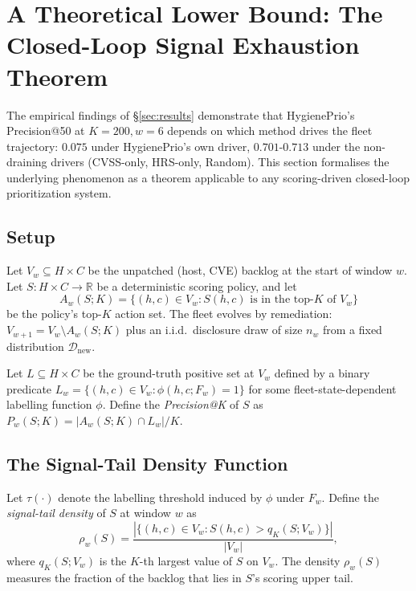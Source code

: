 \section{A Theoretical Lower Bound: The Closed-Loop Signal Exhaustion Theorem}
\label{sec:theorem}

The empirical findings of \S\ref{sec:results} demonstrate that
HygienePrio's Precision@50 at $K = 200, w = 6$ depends on which method
drives the fleet trajectory: $0.075$ under HygienePrio's own driver,
$0.701$-$0.713$ under the non-draining drivers (CVSS-only, HRS-only,
Random). This section formalises the
underlying phenomenon as a theorem applicable to any
scoring-driven closed-loop prioritization system.

\subsection{Setup}

Let $V_w \subseteq H \times C$ be the unpatched (host, CVE) backlog
at the start of window $w$. Let $S: H \times C \to \mathbb{R}$ be a
deterministic scoring policy, and let
\begin{equation}
A_w(S; K) = \{(h, c) \in V_w : S(h, c) \text{ is in the top-}K \text{ of } V_w\}
\end{equation}
be the policy's top-$K$ action set. The fleet evolves by remediation:
$V_{w+1} = V_w \setminus A_w(S; K)$ plus an i.i.d.\ disclosure draw
of size $n_w$ from a fixed distribution $\mathcal{D}_{\text{new}}$.

Let $L \subseteq H \times C$ be the ground-truth positive set
at $V_w$ defined by a binary predicate
$L_w = \{(h, c) \in V_w : \phi(h, c; F_w) = 1\}$ for some
fleet-state-dependent labelling function $\phi$. Define the
\emph{Precision@K} of $S$ as $P_w(S; K) = |A_w(S; K) \cap L_w| / K$.

\subsection{The Signal-Tail Density Function}

Let $\tau(\cdot)$ denote the labelling threshold induced by $\phi$
under $F_w$. Define the \emph{signal-tail density} of $S$ at window
$w$ as
\begin{equation}
\rho_w(S) = \frac{|\{(h, c) \in V_w : S(h, c) > q_K(S; V_w)\}|}{|V_w|},
\end{equation}
where $q_K(S; V_w)$ is the $K$-th largest value of $S$ on $V_w$. The
density $\rho_w(S)$ measures the fraction of the backlog that lies in
$S$'s scoring upper tail.

